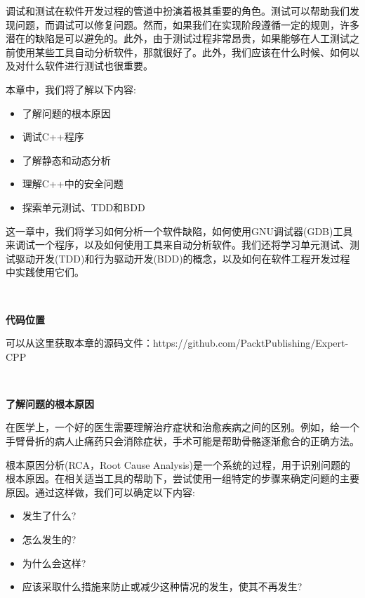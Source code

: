 调试和测试在软件开发过程的管道中扮演着极其重要的角色。测试可以帮助我们发现问题，而调试可以修复问题。然而，如果我们在实现阶段遵循一定的规则，许多潜在的缺陷是可以避免的。此外，由于测试过程非常昂贵，如果能够在人工测试之前使用某些工具自动分析软件，那就很好了。此外，我们应该在什么时候、如何以及对什么软件进行测试也很重要。 \par

本章中，我们将了解以下内容: \par

\begin{itemize}
	\item 了解问题的根本原因
	\item 调试C++程序
	\item 了解静态和动态分析
	\item 理解C++中的安全问题
	\item 探索单元测试、TDD和BDD
\end{itemize}

这一章中，我们将学习如何分析一个软件缺陷，如何使用GNU调试器(GDB)工具来调试一个程序，以及如何使用工具来自动分析软件。我们还将学习单元测试、测试驱动开发(TDD)和行为驱动开发(BDD)的概念，以及如何在软件工程开发过程中实践使用它们。 \par

\noindent\textbf{}\ \par
\textbf{代码位置} \ \par
可以从这里获取本章的源码文件：https:/​/github.​com/PacktPublishing/Expert-CPP \par

\noindent\textbf{}\ \par
\textbf{了解问题的根本原因} \ \par
在医学上，一个好的医生需要理解治疗症状和治愈疾病之间的区别。例如，给一个手臂骨折的病人止痛药只会消除症状，手术可能是帮助骨骼逐渐愈合的正确方法。 \par
根本原因分析(RCA，Root Cause Analysis)是一个系统的过程，用于识别问题的根本原因。在相关适当工具的帮助下，尝试使用一组特定的步骤来确定问题的主要原因。通过这样做，我们可以确定以下内容: \par

\begin{itemize}
	\item 发生了什么?
	\item 怎么发生的?
	\item 为什么会这样?
	\item 应该采取什么措施来防止或减少这种情况的发生，使其不再发生?
\end{itemize}

